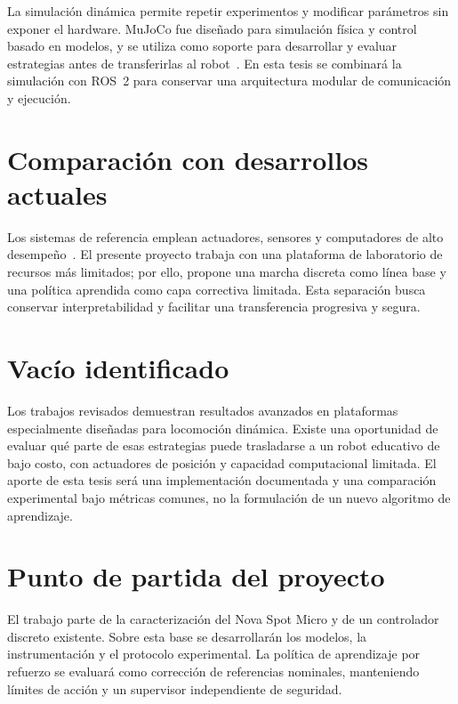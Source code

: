 La simulación dinámica permite repetir experimentos y modificar parámetros sin exponer el hardware. MuJoCo fue diseñado para simulación física y control basado en modelos, y se utiliza como soporte para desarrollar y evaluar estrategias antes de transferirlas al robot~\cite{todorov2012mujoco,tassa2018controlsuite}. En esta tesis se combinará la simulación con ROS~2 para conservar una arquitectura modular de comunicación y ejecución.

\section{Comparación con desarrollos actuales}

Los sistemas de referencia emplean actuadores, sensores y computadores de alto desempeño~\cite{bledt2018cheetah3,hutter2016anymal}. El presente proyecto trabaja con una plataforma de laboratorio de recursos más limitados; por ello, propone una marcha discreta como línea base y una política aprendida como capa correctiva limitada. Esta separación busca conservar interpretabilidad y facilitar una transferencia progresiva y segura.

\section{Vacío identificado}

Los trabajos revisados demuestran resultados avanzados en plataformas especialmente diseñadas para locomoción dinámica. Existe una oportunidad de evaluar qué parte de esas estrategias puede trasladarse a un robot educativo de bajo costo, con actuadores de posición y capacidad computacional limitada. El aporte de esta tesis será una implementación documentada y una comparación experimental bajo métricas comunes, no la formulación de un nuevo algoritmo de aprendizaje.

\section{Punto de partida del proyecto}

El trabajo parte de la caracterización del Nova Spot Micro y de un controlador discreto existente. Sobre esta base se desarrollarán los modelos, la instrumentación y el protocolo experimental. La política de aprendizaje por refuerzo se evaluará como corrección de referencias nominales, manteniendo límites de acción y un supervisor independiente de seguridad.
